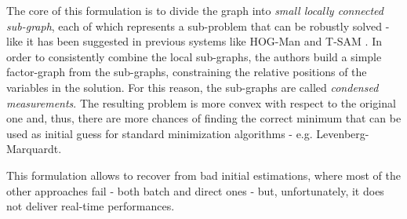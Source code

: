 The core of this formulation is to divide the graph into \textit{small locally connected sub-graph}, each of which represents a sub-problem that can be robustly solved - like it has been suggested in previous systems like HOG-Man \cite{grisetti2010hogman} and T-SAM \cite{ni2010nestedDiss}. In order to consistently combine the local sub-graphs, the authors build a simple factor-graph from the sub-graphs, constraining the relative positions of the variables in the solution. For this reason, the sub-graphs are called \textit{condensed measurements}. The resulting problem is more convex with respect to the original one and, thus, there are more chances of finding the correct minimum that can be used as initial guess for standard minimization algorithms - e.g. Levenberg-Marquardt.

This formulation allows to recover from bad initial estimations, where most of the other approaches fail - both batch and direct ones - but, unfortunately, it does not deliver real-time performances.

